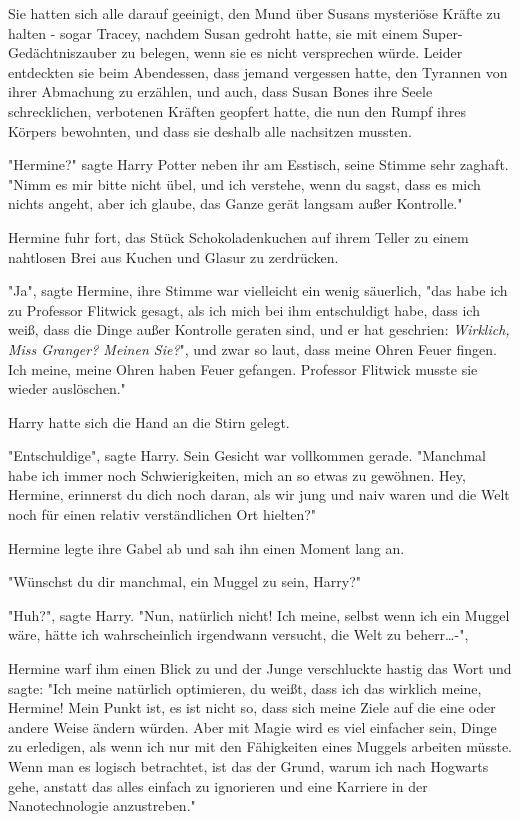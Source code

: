 {Sie hatten sich alle darauf geeinigt, den Mund über Susans mysteriöse Kräfte zu halten - sogar Tracey, nachdem Susan gedroht hatte, sie mit einem Super-Gedächtniszauber zu belegen, wenn sie es nicht versprechen würde. Leider entdeckten sie beim Abendessen, dass jemand vergessen hatte, den Tyrannen von ihrer Abmachung zu erzählen, und auch, dass Susan Bones ihre Seele schrecklichen, verbotenen Kräften geopfert hatte, die nun den Rumpf ihres Körpers bewohnten, und dass sie deshalb alle nachsitzen mussten.

"Hermine?" sagte Harry Potter neben ihr am Esstisch, seine Stimme sehr zaghaft. "Nimm es mir bitte nicht übel, und ich verstehe, wenn du sagst, dass es mich nichts angeht, aber ich glaube, das Ganze gerät langsam außer Kontrolle."

Hermine fuhr fort, das Stück Schokoladenkuchen auf ihrem Teller zu einem nahtlosen Brei aus Kuchen und Glasur zu zerdrücken.

"Ja", sagte Hermine, ihre Stimme war vielleicht ein wenig säuerlich, "das habe ich zu Professor Flitwick gesagt, als ich mich bei ihm entschuldigt habe, dass ich weiß, dass die Dinge außer Kontrolle geraten sind, und er hat geschrien: \emph{Wirklich, Miss Granger? Meinen Sie?}", und zwar so laut, dass meine Ohren Feuer fingen. Ich meine, meine Ohren haben Feuer gefangen. Professor Flitwick musste sie wieder auslöschen."

Harry hatte sich die Hand an die Stirn gelegt.

"Entschuldige", sagte Harry. Sein Gesicht war vollkommen gerade. "Manchmal habe ich immer noch Schwierigkeiten, mich an so etwas zu gewöhnen. Hey, Hermine, erinnerst du dich noch daran, als wir jung und naiv waren und die Welt noch für einen relativ verständlichen Ort hielten?"

Hermine legte ihre Gabel ab und sah ihn einen Moment lang an.

"Wünschst du dir manchmal, ein Muggel zu sein, Harry?"

"Huh?", sagte Harry. "Nun, natürlich nicht! Ich meine, selbst wenn ich ein Muggel wäre, hätte ich wahrscheinlich irgendwann versucht, die Welt zu beherr…-",

Hermine warf ihm einen Blick zu und der Junge verschluckte hastig das Wort und sagte: "Ich meine natürlich optimieren, du weißt, dass ich das wirklich meine, Hermine! Mein Punkt ist, es ist nicht so, dass sich meine Ziele auf die eine oder andere Weise ändern würden. Aber mit Magie wird es viel einfacher sein, Dinge zu erledigen, als wenn ich nur mit den Fähigkeiten eines Muggels arbeiten müsste. Wenn man es logisch betrachtet, ist das der Grund, warum ich nach Hogwarts gehe, anstatt das alles einfach zu ignorieren und eine Karriere in der Nanotechnologie anzustreben."

}
